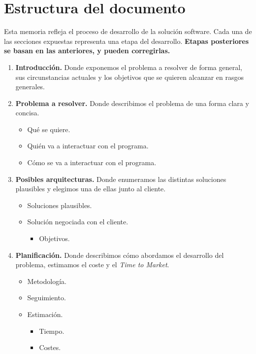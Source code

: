 \section{Estructura del documento}

Esta memoria refleja el proceso de desarrollo de la solución software.
Cada una de las secciones expuestas representa una etapa del desarrollo.
\textbf{Etapas posteriores se basan en las anteriores, y pueden corregirlas.}

\begin{enumerate}
    \item \textbf{Introducción.} Donde exponemos el problema a resolver de forma general,
    sus circunstancias actuales y los objetivos que se quieren alcanzar en rasgos generales.
    \item \textbf{Problema a resolver.} Donde describimos el problema de una forma clara y concisa.
    \begin{itemize}
        \item Qué se quiere.
        \item Quién va a interactuar con el programa.
        \item Cómo se va a interactuar con el programa.
    \end{itemize}
    \item \textbf{Posibles arquitecturas.} Donde enumeramos las distintas soluciones plausibles
    y elegimos una de ellas junto al cliente.
    \begin{itemize}
        \item Soluciones plausibles.
        \item Solución negociada con el cliente.
        \begin{itemize}
            \item Objetivos.
        \end{itemize}
    \end{itemize}
    \item \textbf{Planificación.} Donde describimos cómo abordamos el desarrollo del problema,
    estimamos el coste y el \textit{Time to Market}.
    \begin{itemize}
        \item Metodología.
        \item Seguimiento.
        \item Estimación.
        \begin{itemize}
            \item Tiempo.
            \item Costes.

\end{itemize}
\end{itemize}
\end{enumerate}
